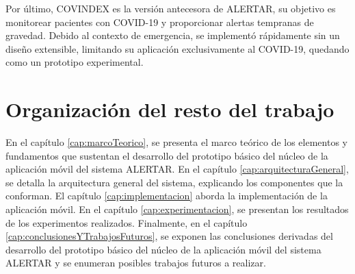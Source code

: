 Por último, COVINDEX \cite{chiarotto2024covindex, chiarottoJornadasCloud} es la versión antecesora de ALERTAR, su objetivo es monitorear pacientes con COVID-19 y proporcionar alertas tempranas de gravedad. Debido al contexto de emergencia, se implementó rápidamente sin un diseño extensible, limitando su aplicación exclusivamente al COVID-19, quedando como un prototipo experimental.


\section{Organización del resto del trabajo}
En el capítulo \ref{cap:marcoTeorico}, se presenta el marco teórico de los elementos y fundamentos que sustentan el desarrollo del prototipo básico del núcleo de la aplicación móvil del sistema ALERTAR. En el capítulo \ref{cap:arquitecturaGeneral}, se detalla la arquitectura general del sistema, explicando los componentes que la conforman. El capítulo \ref{cap:implementacion} aborda la implementación de la aplicación móvil. En el capítulo \ref{cap:experimentacion}, se presentan los resultados de los experimentos realizados. Finalmente, en el capítulo \ref{cap:conclusionesYTrabajosFuturos}, se exponen las conclusiones derivadas del desarrollo del prototipo básico del núcleo de la aplicación móvil del sistema ALERTAR y se enumeran posibles trabajos futuros a realizar.